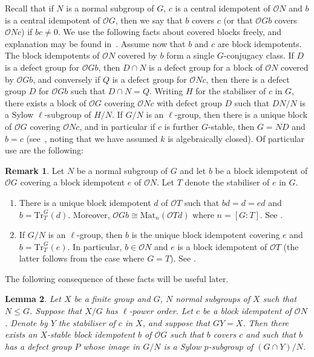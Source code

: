 \documentclass{amsart}
\theoremstyle{plain}\newtheorem{Theorem}{Theorem}[section]
\theoremstyle{plain}\newtheorem{Conjecture}[Theorem]{Conjecture}
\theoremstyle{plain}\newtheorem{Corollary}[Theorem]{Corollary}
\theoremstyle{plain}\newtheorem{Lemma}[Theorem]{Lemma}
\theoremstyle{plain}\newtheorem{Proposition}[Theorem]{Proposition}
\theoremstyle{definition}\newtheorem{Definition}[Theorem]{Definition}
\theoremstyle{definition}\newtheorem{Example}[Theorem]{Example}
\theoremstyle{definition}\newtheorem{Examples}[Theorem]{Examples}
\theoremstyle{definition}\newtheorem{Exercise}[Theorem]{Exercise}
\theoremstyle{definition}\newtheorem{Notation}[Theorem]{Notation}
\theoremstyle{definition}\newtheorem{Remark}[Theorem]{Remark}
\theoremstyle{definition}\newtheorem{Remarks}[Theorem]{Remarks}
\def\CO{{\mathcal{O}}}    \def\OPE{{\mathcal{O}(P\rtimes E)}}
\def\Tr{\mathrm{Tr}}             \def\tenOT{\otimes_{\mathcal{O}T}}
\numberwithin{equation}{section}
\begin{document}
Recall that  if  $N$ is  a normal subgroup of  $G$, $c$ is a central idempotent of $\CO N$  and  $b$ is a central idempotent of $\CO G$, then we  say that $b$ covers $c$  (or that $\CO Gb$ covers $\CO N c$)  if $bc\ne 0 $. We use the following facts about covered blocks freely, and explanation may be found in~\cite[Sec.~6.8]{LiBookII}.
Assume now that $b$ and $c$ are block idempotents. The block idempotents of $\CO N$ covered by $b$ form a single $G$-conjugacy class. If $D$ is a defect group for $\CO Gb$, then $D \cap N$ is a defect group for a block of $\CO N$ covered by $\CO Gb$, and conversely if $Q$ is a defect group for $\CO Nc$, then there is a defect group $D$ for $\CO Gb$ such that $D \cap N = Q$. Writing $H$ for the stabiliser of $c$ in $G$, there exists a block of $\CO G$ covering $\CO Nc$ with defect group $D$ such that $DN/N$ is a Sylow $\ell$-subgroup of $H/N$. If $G/N$ is an $\ell$-group, then there is a unique block of $\CO G$ covering $\CO Nc$, and in particular if $c$ is further $G$-stable, then $G=ND$ and $b=c$ (see~\cite[Thm.~ 6.5.4]{LiBookII}, noting that we have assumed $k$ is algebraically closed). Of particular use are the following:

\begin{Remark}
  Let $N$ be a normal subgroup of $G$ and let $b$ be a block idempotent of $\CO G$ covering a block idempotent $e$ of $\CO N$. Let $T$ denote the stabiliser of $e$ in $G$.
  \begin{enumerate}
    \item There is a unique block idempotent $d$ of $\CO T$ such that $bd=d=ed$ and $b=\Tr_T^G(d)$. Moreover, $\CO G b \cong \mathrm{Mat}_n(\CO T d)$ where $n=[G:T]$. See \cite[Prop.~6.8.3]{LiBookII}.
    \item If $G/N$ is an $\ell$-group, then $b$ is the unique block idempotent covering $e$ and $b=\Tr_T^G(e)$. In particular, $b\in \CO N$ and $e$ is a block idempotent of $\CO T$ (the latter follows from the case where $G=T$). See \cite[Prop.~6.8.11]{LiBookII}.
  \end{enumerate}
\end{Remark}



The following consequence of these facts will be useful later.

\begin{Lemma}  \label{lem-stableblock}
Let $X$ be a finite group and $G$, $N$ normal subgroups of $X$ such that $N\leq G$.
Suppose that $X/G$ has $\ell$-power order.
Let $c$ be a block idempotent of $\CO N$.  Denote by $Y$ the stabiliser of $c$ in $X$,
and suppose that $GY=X$. %
 Then there exists an $X$-stable block idempotent $b$ of $\CO G$ such that $b$ covers $c$
and such that $b$ has a defect group $P$ whose image in $G/N$ is a Sylow 
$p$-subgroup of $(G\cap Y)/N$.
\end{Lemma}
\end{document}
